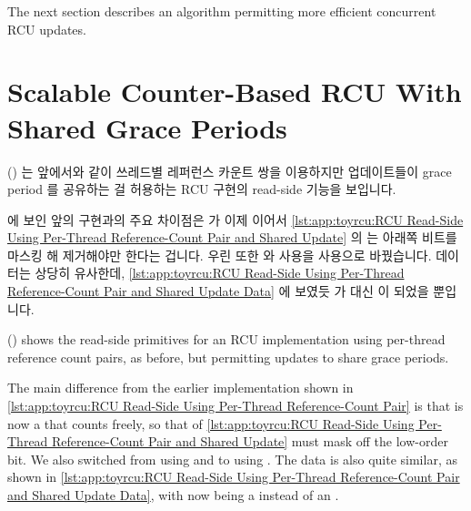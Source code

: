 The next section describes an algorithm permitting more efficient
concurrent RCU updates.

\fi

\section{Scalable Counter-Based RCU With Shared Grace Periods}
\label{sec:app:toyrcu:Scalable Counter-Based RCU With Shared Grace Periods}

()
는 앞에서와 같이 쓰레드별 레퍼런스 카운트 쌍을 이용하지만 업데이트들이 grace
period 를 공유하는 걸 허용하는 RCU 구현의 read-side 기능을 보입니다.
\begin{fcvref}
에 보인
앞의 구현과의 주요 차이점은  가 이제  이어서
\cref{lst:app:toyrcu:RCU Read-Side Using Per-Thread Reference-Count Pair and Shared Update}
의  는 아래쪽 비트를 마스킹 해 제거해야만 한다는 겁니다.
우린 또한  와  사용을 
사용으로 바꿨습니다.
데이터는 상당히 유사한데,
\cref{lst:app:toyrcu:RCU Read-Side Using Per-Thread Reference-Count Pair and Shared Update Data}
에 보였듯  가  대신  이 되었을 뿐입니다.
\end{fcvref}

\iffalse

()
shows the read-side primitives for an RCU implementation using per-thread
reference count pairs, as before, but permitting updates to share
grace periods.
\begin{fcvref}
The main difference from the earlier implementation shown in
\cref{lst:app:toyrcu:RCU Read-Side Using Per-Thread Reference-Count Pair}
is that  is now a  that counts freely,
so that  of
\cref{lst:app:toyrcu:RCU Read-Side Using Per-Thread Reference-Count Pair and Shared Update}
must mask off the low-order bit.
We also switched from using  and 
to using .
The data is also quite similar, as shown in
\cref{lst:app:toyrcu:RCU Read-Side Using Per-Thread Reference-Count Pair and Shared Update Data},
with  now being a  instead of an
.
\end{fcvref}

